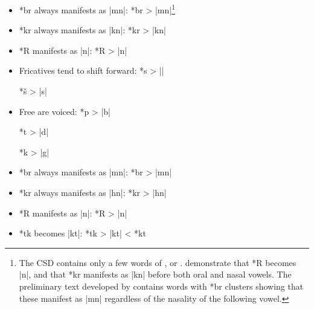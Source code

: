 \documentclass[output=paper]{LSP/langsci}
\begin{document}
 
 \begin{itemize}
 \item  *br always manifests as |mn|:     \hspace{1.5em}  *br       >          |mn|\footnote{The CSD contains only a few words of , or .  \citet{ParksDeMallie1992} demonstrate that *R becomes |n|, and that *kr manifests as |kn| before both oral and nasal vowels.  The preliminary  text developed by \citet{Shields2012} contains words with *br clusters showing that these manifest as |mn| regardless of the nasality of the following vowel.}
 \item *kr always manifests as |kn|:       \hspace{1.6em}        *kr       >          |kn|
 \item *R manifests as |n|: \hspace{5.3em} *R	>	|n|
 \end{itemize}
  
 
 \begin{itemize}
 \item Fricatives tend to shift forward:  \hspace{.7em}   *s         >          ||

\hspace{13.6em}      *š         >          |s|

\item Free  are voiced:  \hspace{1.6em}   *p        >          |b|

\hspace{13.6em}      *t         >          |d|

\hspace{13.6em}       *k        >          |g|

\item *br always manifests as |mn|: \hspace{1.6em}    *br       >          |mn|

\item *kr always manifests as |hn|:  \hspace{1.7em}   *kr       >          |hn|

\item *R manifests as |n|:  \hspace{6em}     *R       >          |n|

 \item *tk becomes |kt|:  \hspace{7em}      *tk       >          |kt|       <          *kt
 \end{itemize}
 
\end{document}
